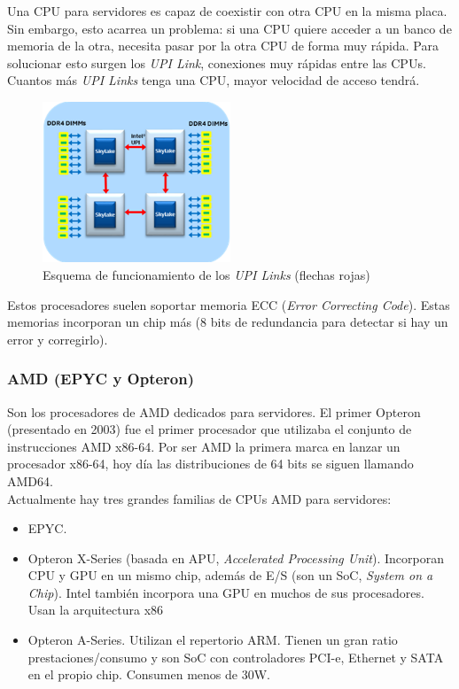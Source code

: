 \documentclass[12pt,spanish]{article}
\begin{document}
Una CPU para servidores es capaz de coexistir con otra CPU en la misma placa. Sin embargo, esto acarrea un problema: si una CPU quiere acceder a un banco de memoria de la otra, necesita pasar por la otra CPU de forma muy rápida. Para solucionar esto surgen los \textit{UPI Link}, conexiones muy rápidas entre las CPUs. Cuantos más \textit{UPI Links} tenga una CPU, mayor velocidad de acceso tendrá.

\begin{figure}[H]
	\centering
	\includegraphics[width=0.5\textwidth]{upi.png}
	\caption{Esquema de funcionamiento de los \textit{UPI Links} (flechas rojas)}
\end{figure}

Estos procesadores suelen soportar memoria ECC (\textit{Error Correcting Code}). Estas memorias incorporan un chip más (8 bits de redundancia para detectar si hay un error y corregirlo).

\subsubsection{AMD (EPYC y Opteron)}

Son los procesadores de AMD dedicados para servidores. El primer Opteron (presentado en 2003) fue el primer procesador que utilizaba el conjunto de instrucciones AMD x86-64. Por ser AMD la primera marca en lanzar un procesador x86-64, hoy día las distribuciones de 64 bits se siguen llamando AMD64.\\

Actualmente hay tres grandes familias de CPUs AMD para servidores:
\begin{itemize}
	\item EPYC.
	\item Opteron X-Series (basada en APU, \textit{Accelerated Processing Unit}). Incorporan CPU y GPU en un mismo chip, además de E/S (son un SoC, \textit{System on a Chip}). Intel también incorpora una GPU en muchos de sus procesadores. Usan la arquitectura x86
	\item Opteron A-Series. Utilizan el repertorio ARM. Tienen un gran ratio prestaciones/consumo y son SoC con controladores PCI-e, Ethernet y SATA en el propio chip. Consumen menos de 30W.
\end{itemize}
\end{document}
